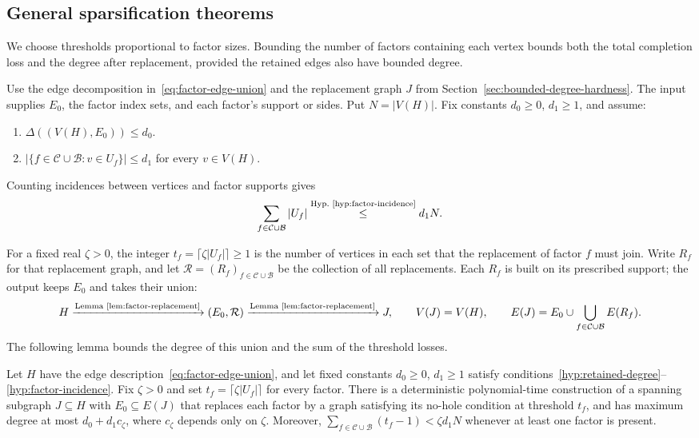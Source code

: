 \subsection{General sparsification theorems}
\label{subsec:general-sparsification}

We choose thresholds proportional to factor sizes. Bounding the
number of factors containing each vertex bounds both the total
completion loss and the degree after replacement, provided the
retained edges also have bounded degree.

Use the edge decomposition in~\eqref{eq:factor-edge-union} and the
replacement graph $J$ from Section~\ref{sec:bounded-degree-hardness}.
The input supplies $E_0$, the factor index sets, and each factor's
support or sides. Put $N=|V(H)|$.
Fix constants $d_0\ge0$,
$d_1\ge1$, and assume:
\begin{enumerate}
\item\label{hyp:retained-degree} $\Delta((V(H),E_0))\le d_0$.
\item\label{hyp:factor-incidence}
$|\{f\in\mathcal C\cup\mathcal B:v\in U_f\}|\le d_1$
for every $v\in V(H)$.
\end{enumerate}
Counting incidences between vertices and factor supports gives
\begin{equation}\label{eq:general-factor-incidence}
 \sum_{f\in\mathcal C\cup\mathcal B}|U_f|
 \overset{\text{Hyp.~\ref{hyp:factor-incidence}}}{\leq}d_1N.
\end{equation}

For a fixed real $\zeta>0$, the integer
$t_f=\lceil\zeta|U_f|\rceil\ge1$ is the number of vertices in
each set that the replacement of factor $f$ must join. Write $R_f$
for that replacement graph, and let
$\mathcal R=(R_f)_{f\in\mathcal C\cup\mathcal B}$ be the collection
of all replacements. Each $R_f$ is built on its prescribed support;
the output keeps $E_0$ and takes their union:
\[
 H\xrightarrow{\text{Lemma~\ref{lem:factor-replacement}}}(E_0,\mathcal R)
 \xrightarrow{\text{Lemma~\ref{lem:factor-replacement}}}J,\qquad
 V(J)=V(H),\qquad
 E(J)=E_0\cup\bigcup_{f\in\mathcal C\cup\mathcal B}E(R_f).
\]
The following lemma bounds the degree of this union and the sum of
the threshold losses.

\begin{lemma}
\label{lem:factor-replacement}
Let $H$ have the edge description~\eqref{eq:factor-edge-union},
and let fixed constants $d_0\ge0$, $d_1\ge1$ satisfy
conditions~\ref{hyp:retained-degree}--\ref{hyp:factor-incidence}.
Fix $\zeta>0$ and set
$t_f=\lceil\zeta|U_f|\rceil$ for every factor. There is a
deterministic polynomial-time construction of a spanning subgraph
$J\subseteq H$ with $E_0\subseteq E(J)$ that replaces each factor by a graph
satisfying its no-hole condition at threshold $t_f$, and has maximum degree at most
$d_0+d_1c_\zeta$, where $c_\zeta$ depends only on $\zeta$.
Moreover,
$\sum_{f\in\mathcal C\cup\mathcal B}(t_f-1)<\zeta d_1N$
whenever at least one factor is present.
\end{lemma}

